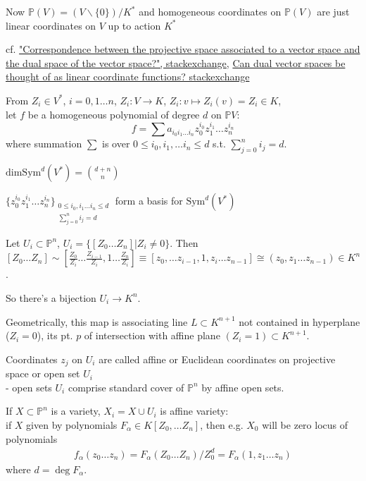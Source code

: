 \documentclass[10pt]{amsart}
\begin{document}
\begin{multicols*}{2}
Now $\mathbb{P}(V) = (V \backslash \lbrace 0 \rbrace ) / K^*$ and homogeneous coordinates on $\mathbb{P}(V)$ are just linear coordinates on $V$ up to action $K^*$

cf. \href{https://math.stackexchange.com/questions/62588/correspondence-between-the-projective-space-associated-to-a-vector-space-and-the}{"Correspondence between the projective space associated to a vector space and the dual space of the vector space?", stackexchange}, \href{https://math.stackexchange.com/questions/2093271/can-dual-vector-spaces-be-thought-of-as-linear-coordinate-functions}{Can dual vector spaces be thought of as linear coordinate functions? stackexchange}

From $Z_i \in V^*$, $i = 0, 1 \dots n$, $Z_i : V \to K$, $Z_i : v \mapsto Z_i(v) = Z_i \in K$, \\
let $f$ be a homogeneous polynomial of degree $d$ on $\mathbb{P}V$:
\[
f = \sum a_{i_0 i_1 \dots i_n} z_0^{i_0} z_1^{i_1} \dots z_n^{i_n} 
\]
where summation $\sum$ is over $0 \leq i_0, i_1, \dots i_n \leq d$ s.t. $\sum_{j=0}^n i_j = d$.

$\text{dim}{\text{Sym}^d(V^*)} = \binom{d+n}{n}$

$\lbrace z_0^{i_0} z_1^{i_1} \dots z_n^{i_n} \rbrace_{ \substack{ 0 \leq i_0 , i_1 \dots i_n \leq d \\ \sum_{j=0}^n i_j = d } }$ form a basis for $\text{Sym}^d(V^*)$
 
Let $U_i \subset \mathbb{P}^n$, $U_i = \lbrace [Z_0 \dots Z_n ] | Z_i \neq 0 \rbrace$. Then $[Z_0 \dots Z_n ] \sim \left[ \frac{Z_0}{Z_i} \dots \frac{Z_{i-1}}{ Z_i }, 1 \dots \frac{Z_n}{Z_i} \right] \equiv [ z_0, \dots z_{i-1} , 1 , z_i \dots z_{n-1} ] \cong (z_0 , z_1 \dots z_{n-1}) \in K^n$. 

So there's a bijection $U_i \to K^n$.

Geometrically, this map is associating line $L \subset K^{n+1}$ not contained in hyperplane ($Z_i = 0$), its pt. $p$ of intersection with affine plane $(Z_i = 1) \subset K^{n+1}$.  

Coordinates $z_j$ on $U_i$ are called affine or Euclidean coordinates on projective space or open set $U_i$ \\
- open sets $U_i$ comprise standard cover of $\mathbb{P}^n$ by affine open sets.

If $X \subset \mathbb{P}^n$ is a variety, $X_i = X \cup U_i$ is affine variety: \\
if $X$ given by polynomials $F_{\alpha} \in K[Z_0 , \dots Z_n]$, then e.g. $X_0$ will be zero locus of polynomials
\[
\begin{gathered}
f_{\alpha}(z_0 \dots z_n) = F_{\alpha}(Z_0 \dots Z_n) / Z_0^d = F_{\alpha}(1, z_1 \dots z_n)
\end{gathered}
\]
where $d = \deg{F_{\alpha}}$. 


\end{multicols*}
\end{document}
